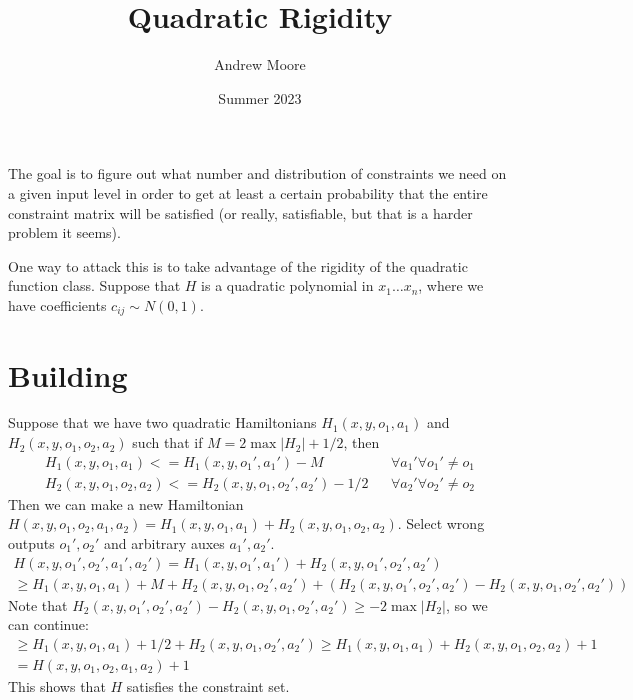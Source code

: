 \documentclass{article}
\title{Quadratic Rigidity}
\author{Andrew Moore}
\date{Summer 2023}
\begin{document}
\maketitle

The goal is to figure out what number and distribution of constraints we need on a given input level in order to get at least a certain probability that the entire constraint matrix will be satisfied (or really, satisfiable, but that is a harder problem it seems). 

One way to attack this is to take advantage of the rigidity of the quadratic function class. Suppose that $H$ is a quadratic polynomial in $x_1 \dots x_n$, where we have coefficients $c_{ij} \sim N(0,1)$. 

\section{Building}

Suppose that we have two quadratic Hamiltonians $H_1(x, y, o_1, a_1)$ and $H_2(x, y, o_1, o_2, a_2)$ such that if $M = 2\max |H_2|+1/2$, then
\begin{align}
	H_1(x, y, o_1, a_1) <= H_1(x, y, o_1', a_1') - M &&\forall a_1' \forall o_1' \neq o_1\\
	H_2(x,y,o_1,o_2, a_2) <= H_2(x,y,o_1,o_2',a_2')-1/2 &&\forall a_2' \forall o_2' \neq o_2
\end{align}
Then we can make a new Hamiltonian $H(x,y,o_1,o_2,a_1,a_2) = H_1(x,y,o_1,a_1) + H_2(x,y,o_1,o_2,a_2)$. Select wrong outputs $o_1', o_2'$ and arbitrary auxes $a_1', a_2'$. 
\begin{align}
	H(x,y,o_1',o_2',a_1',a_2') = H_1(x,y,o_1',a_1') + H_2(x,y,o_1',o_2',a_2') \\
	\geq H_1(x,y,o_1,a_1) + M + H_2(x,y,o_1,o_2',a_2') + (H_2(x,y,o_1', o_2', a_2') - H_2(x,y,o_1,o_2',a_2'))
\end{align}
Note that $H_2(x,y,o_1', o_2', a_2') - H_2(x,y,o_1,o_2',a_2') \geq -2\max|H_2|$, so we can continue:
\begin{align}
	\geq H_1(x,y,o_1,a_1) + 1/2 + H_2(x,y,o_1,o_2',a_2') \geq H_1(x,y,o_1,a_1) + H_2(x,y,o_1,o_2,a_2) + 1\\
	= H(x,y,o_1,o_2,a_1,a_2) + 1
\end{align}
This shows that $H$ satisfies the constraint set. 
\end{document}
